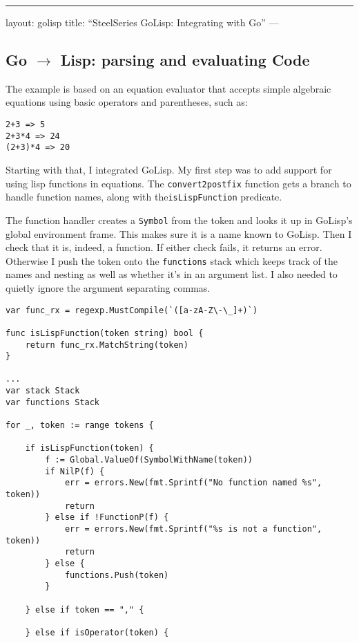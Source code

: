 \documentclass{scrartcl}
\begin{document}
\begin{center}
\rule{3in}{0.4pt}
\end{center}
layout: golisp
title: ``SteelSeries GoLisp: Integrating with Go''
---

\subsection{Go $\rightarrow${} Lisp: parsing and evaluating Code}\hypertarget{go-rarr-lisp-parsing-and-evaluating-code}{}\label{go-rarr-lisp-parsing-and-evaluating-code}

The example is based on an equation evaluator that accepts simple
algebraic equations using basic operators and parentheses, such as:

\begin{verbatim}2+3 => 5
2+3*4 => 24
(2+3)*4 => 20
\end{verbatim}

Starting with that, I integrated GoLisp. My first step was to add support for using lisp functions in equations. The \texttt{convert2postfix} function gets a branch to handle function names, along with the\texttt{isLispFunction} predicate.

The function handler creates a \texttt{Symbol} from the token and looks it up in GoLisp's global environment frame. This makes sure it is a name known to GoLisp. Then I check that it is, indeed, a function. If either check fails, it returns an error. Otherwise I push the token onto the \texttt{functions} stack which keeps track of the names and nesting as well as whether it's in an argument list. I also needed to quietly ignore the argument separating commas.

\begin{verbatim}var func_rx = regexp.MustCompile(`([a-zA-Z\-\_]+)`)

func isLispFunction(token string) bool {
    return func_rx.MatchString(token)
}

...
var stack Stack
var functions Stack

for _, token := range tokens {

    if isLispFunction(token) {
        f := Global.ValueOf(SymbolWithName(token))
        if NilP(f) {
            err = errors.New(fmt.Sprintf("No function named %s", token))
            return
        } else if !FunctionP(f) {
            err = errors.New(fmt.Sprintf("%s is not a function", token))
            return
        } else {
            functions.Push(token)
        }

    } else if token == "," {

    } else if isOperator(token) {
\end{verbatim}
\end{document}
